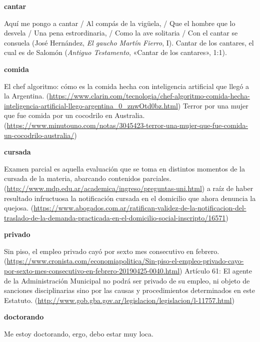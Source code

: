 \begin{ejercicio}
\begin{exe}
  \ex \textbf{cantar}
    \begin{xlist}
      \ex Aquí me pongo a cantar / Al compás de la vigüela, / Que el hombre que
          lo desvela / Una pena estrordinaria, / Como la ave solitaria / Con el
          cantar se consuela (José Hernández, \textit{El gaucho Martín Fierro},
          I).
      \ex Cantar de los cantares, el cual es de Salomón (\textit{Antiguo
          Testamento}, «Cantar de los cantares», 1:1).
    \end{xlist}
  \ex \textbf{comida}
    \begin{xlist}
      \ex El chef algoritmo: cómo es la comida hecha con inteligencia artificial
          que llegó a la Argentina.
          (\url{https://www.clarin.com/tecnologia/chef-algoritmo-comida-hecha-inteligencia-artificial-llego-argentina_0_znwOtd0bz.html})
      \ex Terror por una mujer que fue comida por un cocodrilo en Australia.
          (\url{https://www.minutouno.com/notas/3045423-terror-una-mujer-que-fue-comida-un-cocodrilo-australia/})
    \end{xlist}
  \ex \textbf{cursada}
    \begin{xlist}
      \ex Examen parcial es aquella evaluación que se toma en distintos momentos
          de la cursada de la materia, abarcando contenidos parciales.
          (\url{http://www.mdp.edu.ar/academica/ingreso/preguntas-uni.html})
      \ex [\ldots] a raíz de haber resultado infructuosa la notificación cursada
          en el domicilio que ahora denuncia la quejosa.
          (\url{https://www.abogados.com.ar/ratifican-validez-de-la-notificacion-del-traslado-de-la-demanda-practicada-en-el-domicilio-social-inscripto/16571})
    \end{xlist}
  \ex \textbf{privado}
    \begin{xlist}
      \ex Sin piso, el empleo privado cayó por sexto mes consecutivo en febrero.
          (\url{https://www.cronista.com/economiapolitica/Sin-piso-el-empleo-privado-cayo-por-sexto-mes-consecutivo-en-febrero-20190425-0040.html})
      \ex Artículo 61: El agente de la Administración Municipal no podrá ser
          privado de su empleo, ni objeto de sanciones disciplinarias sino por
          las causas y procedimientos determinados en este Estatuto.
          (\url{http://www.gob.gba.gov.ar/legislacion/legislacion/l-11757.html})
    \end{xlist}
  \ex \textbf{doctorando}
    \begin{xlist}
      \ex Me estoy doctorando, ergo, debo estar muy loca.

\end{xlist}
\end{exe}
\end{ejercicio}
